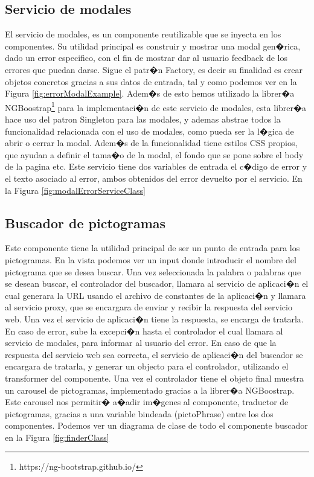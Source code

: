 \subsection{Servicio de modales}  

El servicio de modales, es un componente reutilizable que se inyecta en los componentes. Su utilidad principal es construir y mostrar una modal  gen�rica, dado un error especifico, con el fin de mostrar dar al usuario feedback de los errores que puedan darse. Sigue el patr�n Factory, es decir su finalidad es crear objetos concretos gracias a sus datos de entrada, tal y como podemos ver en la Figura \ref{fig:errorModalExample}. Adem�s de esto hemos utilizado la librer�a NGBoostrap\footnote{https://ng-bootstrap.github.io/} para la implementaci�n de este servicio de modales, esta librer�a hace uso del patron Singleton para las modales, y ademas abstrae todos la funcionalidad relacionada con el uso de modales, como pueda ser la l�gica de abrir o cerrar la modal. Adem�s de la funcionalidad tiene estilos CSS propios, que ayudan a definir el tama�o de la modal, el fondo que se pone sobre el body de la pagina etc. 
Este servicio tiene dos variables de entrada el c�digo de error y el texto asociado al error, ambos obtenidos del error devuelto por el servicio. En la Figura \ref{fig:modalErrorServiceClass}

\subsection{Buscador de pictogramas}
Este componente tiene la utilidad principal de ser un punto de entrada para los pictogramas. En la vista podemos ver un input donde introducir el nombre del pictograma que se desea buscar. Una vez seleccionada la palabra o palabras que se desean buscar, el controlador del buscador, llamara al servicio de aplicaci�n el cual generara la URL usando el archivo de constantes de la aplicaci�n y llamara al servicio proxy, que se encargara de enviar y recibir la respuesta del servicio web. Una vez el servicio de aplicaci�n tiene la respuesta, se encarga de tratarla. En caso de error, sube la excepci�n hasta el controlador el cual llamara al servicio de modales, para informar al usuario del error. En caso de que la respuesta del servicio web sea correcta, el servicio de aplicaci�n del buscador se encargara de tratarla, y generar un objecto para el controlador, utilizando el transformer del componente. Una vez el controlador tiene el objeto final muestra un carousel de pictogramas, implementado gracias a la librer�a NGBoostrap. Este carousel nos permitir� a�adir im�genes al componente, traductor de pictogramas, gracias a una variable bindeada (pictoPhrase) entre los dos componentes. 
Podemos ver un diagrama de clase de todo el componente buscador en la Figura \ref{fig:finderClass}    

